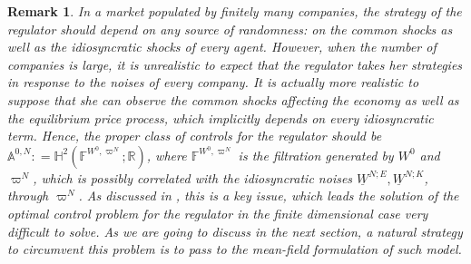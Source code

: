\documentclass[10pt,a4paper]{amsart}
\newtheorem{remark}[theorem]{Remark}
\numberwithin{equation}{section}
\newcommand{\w}{\varpi}
\newcommand{\F}{\mathbb{F}}
\newcommand{\R}{\mathbb{R}}
\begin{document}
\begin{remark}
\label{rmk: controls reg N}
In a market populated by finitely many companies, the strategy of the regulator should depend on any source of randomness: on the common shocks as well as the idiosyncratic shocks of every agent. However, when the number of companies is large, it is unrealistic to expect that the regulator takes her strategies in response to the noises of every company. It is actually more realistic to suppose that she can observe the common shocks affecting the economy as well as the equilibrium price process, which implicitly depends on every idiosyncratic term. Hence, the proper class of controls for the regulator should be $\mathbb{A}^{0,N} : =\mathbb{H}^2( \F^{W^0,\w^N};\R)$, where $\F^{W^0,\w^N}$ is the filtration generated by $W^0$ and $\w^N$, which is possibly correlated with the idiosyncratic noises $\underline{W}^{N;E}, \underline{W}^{N;K}$, through $\w^N$. As discussed in \cite[Remark 3.1]{fujii2022equilibrium}, this is a key issue, which leads the solution of the optimal control problem for the regulator in the finite dimensional case very difficult to solve. As we are going to discuss in the next section, a natural strategy to circumvent this problem is to pass to the mean-field formulation of such model. 
\end{remark}
\end{document}
